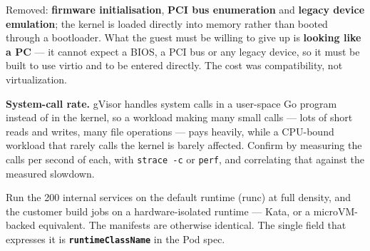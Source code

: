 \begin{ans}
  \item Removed: \textbf{firmware initialisation}, \textbf{PCI bus enumeration}
        and \textbf{legacy device emulation}; the kernel is loaded directly into
        memory rather than booted through a bootloader. What the guest must be
        willing to give up is \textbf{looking like a PC} --- it cannot expect a
        BIOS, a PCI bus or any legacy device, so it must be built to use virtio
        and to be entered directly. The cost was compatibility, not
        virtualization.
  \item \textbf{System-call rate.} gVisor handles system calls in a user-space
        Go program instead of in the kernel, so a workload making many small
        calls --- lots of short reads and writes, many file operations --- pays
        heavily, while a CPU-bound workload that rarely calls the kernel is
        barely affected. Confirm by measuring the calls per second of each, with
        \texttt{strace -c} or \texttt{perf}, and correlating that against the
        measured slowdown.
  \item Run the 200 internal services on the default runtime (runc) at full
        density, and the customer build jobs on a hardware-isolated runtime ---
        Kata, or a microVM-backed equivalent. The manifests are otherwise
        identical. The single field that expresses it is
        \textbf{\texttt{runtimeClassName}} in the Pod spec.
\end{ans}

